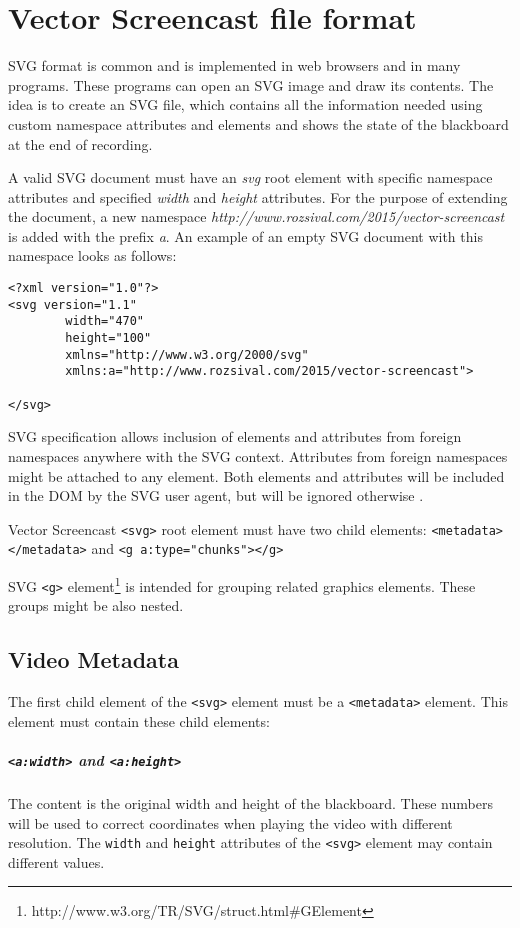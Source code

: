 \chapter{Vector Screencast file format}
\label{c:the-format}

SVG format is common and is implemented in web browsers and in many programs. These programs can open an SVG image and draw its contents. The idea is to create an SVG file, which contains all the information needed using custom namespace attributes and elements and shows the state of the blackboard at the end of recording.

A valid SVG document must have an \textit{svg} root element with specific namespace attributes and specified \textit{width} and \textit{height} attributes. For the purpose of extending the document, a new namespace \textit{http://www.rozsival.com/2015/vector-screencast} is added with the prefix \textit{a}. An example of an empty SVG document with this namespace looks as follows:

\begin{lstlisting}
<?xml version="1.0"?>
<svg version="1.1"
        width="470"
        height="100"
        xmlns="http://www.w3.org/2000/svg"
        xmlns:a="http://www.rozsival.com/2015/vector-screencast">

</svg>
\end{lstlisting}

SVG specification allows inclusion of elements and attributes from foreign namespaces anywhere with the SVG context. Attributes from foreign namespaces might be attached to any element. Both elements and attributes will be included in the DOM by the SVG user agent, but will be ignored otherwise \cite{svg_exteding}.

Vector Screencast \verb|<svg>| root element must have two child elements: \verb|<metadata></metadata>| and \verb|<g a:type="chunks"></g>|

SVG \verb|<g>| element\footnote{http://www.w3.org/TR/SVG/struct.html\#GElement} is intended for grouping related graphics elements. These groups might be also nested.

\section{Video Metadata}
The first child element of the \verb|<svg>| element must be a \verb|<metadata>| element. This element must contain these child elements:

\paragraph{\texttt{\textless a:width\textgreater} and \texttt{\textless a:height\textgreater}}
The content is the original width and height of the blackboard. These numbers will be used to correct coordinates when playing the video with different resolution. The \verb|width| and \verb|height| attributes of the \verb|<svg>| element may contain different values.

